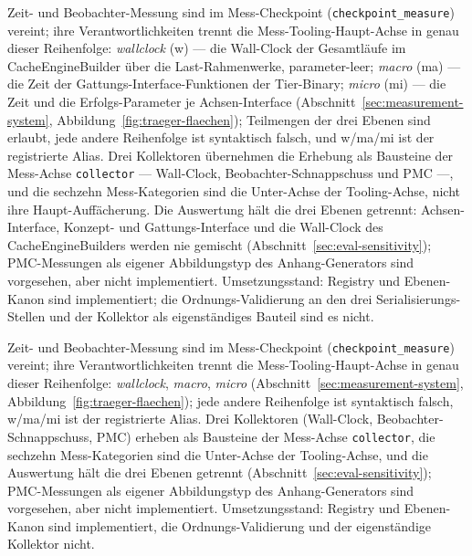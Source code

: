 \begin{nurlang}
Zeit- und Beobachter-Messung sind im Mess-Checkpoint (\texttt{checkpoint\_measure}) vereint; ihre
Verantwortlichkeiten trennt die Mess-Tooling-Haupt-Achse in genau dieser Reihenfolge: \emph{wallclock}
(w) --- die Wall-Clock der Gesamtläufe im CacheEngineBuilder über die Last-Rahmenwerke,
parameter-leer; \emph{macro} (ma) --- die Zeit der Gattungs-Interface-Funktionen der Tier-Binary;
\emph{micro} (mi) --- die Zeit und die Erfolgs-Parameter je Achsen-Interface
(Abschnitt~\ref{sec:measurement-system}, Abbildung~\ref{fig:traeger-flaechen}); Teilmengen der drei
Ebenen sind erlaubt, jede andere Reihenfolge ist syntaktisch falsch, und w/ma/mi ist der registrierte
Alias. Drei Kollektoren übernehmen die Erhebung als Bausteine der Mess-Achse \texttt{collector} ---
Wall-Clock, Beobachter-Schnappschuss und PMC ---, und die sechzehn Mess-Kategorien sind die
Unter-Achse der Tooling-Achse, nicht ihre Haupt-Auffächerung. Die Auswertung hält die drei Ebenen
getrennt: Achsen-Interface, Konzept- und Gattungs-Interface und die Wall-Clock des CacheEngineBuilders
werden nie gemischt (Abschnitt~\ref{sec:eval-sensitivity}); PMC-Messungen als eigener Abbildungstyp des
Anhang-Generators sind vorgesehen, aber nicht implementiert. Umsetzungsstand: Registry und Ebenen-Kanon sind implementiert;
die Ordnungs-Validierung an den drei Serialisierungs-Stellen und der Kollektor als eigenständiges
Bauteil sind es nicht.
\end{nurlang}
\begin{nurkurz}
Zeit- und Beobachter-Messung sind im Mess-Checkpoint (\texttt{checkpoint\_measure}) vereint; ihre
Verantwortlichkeiten trennt die Mess-Tooling-Haupt-Achse in genau dieser Reihenfolge: \emph{wallclock},
\emph{macro}, \emph{micro} (Abschnitt~\ref{sec:measurement-system}, Abbildung~\ref{fig:traeger-flaechen});
jede andere Reihenfolge ist syntaktisch falsch, w/ma/mi ist der registrierte Alias. Drei Kollektoren
(Wall-Clock, Beobachter-Schnappschuss, PMC) erheben als Bausteine der Mess-Achse \texttt{collector}, die
sechzehn Mess-Kategorien sind die Unter-Achse der Tooling-Achse, und die Auswertung hält die drei Ebenen
getrennt (Abschnitt~\ref{sec:eval-sensitivity}); PMC-Messungen als eigener Abbildungstyp des
Anhang-Generators sind vorgesehen, aber nicht implementiert. Umsetzungsstand: Registry und Ebenen-Kanon sind
implementiert, die Ordnungs-Validierung und der eigenständige Kollektor nicht.
\end{nurkurz}

